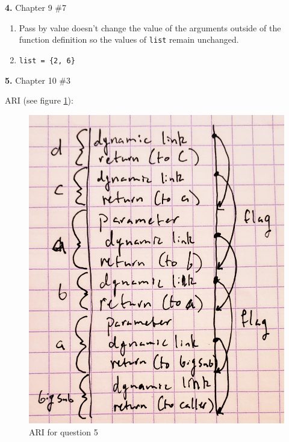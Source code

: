 \documentclass[letterpaper, 11pt]{article}
\newcommand{\hwnumbersec}[3]{\medskip \noindent\textbf{#1.} Chapter #2 \##3 \smallskip}
\begin{document}
\hwnumbersec{4}{9}{7}

\begin{enumerate}[label=(\textbf{\alph*})]
	\item Pass by value doesn't change the value of the arguments outside of
		the function definition so the values of  \texttt{list} remain
		unchanged.
	\item 
		\texttt{list = \{2, 6\}}
\end{enumerate}

\newpage
\hwnumbersec{5}{10}{3}

ARI (see figure \ref{fig:ari}):

\begin{figure}[h]
	\centering
	\includegraphics[scale = 0.1]{hw03q5.jpg}
	\caption{ARI for question 5}
	\label{fig:ari}
\end{figure}
\end{document}
